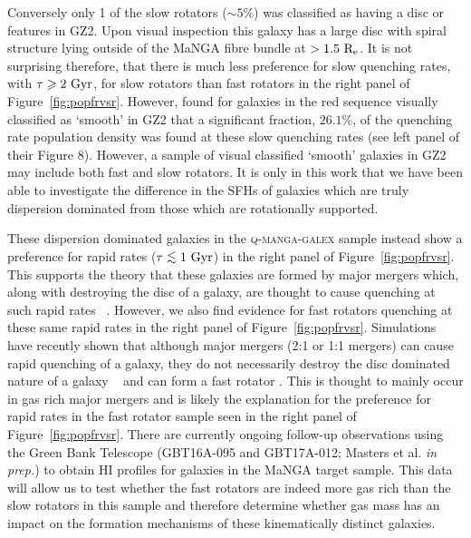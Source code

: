 \documentclass[useAMS,usenatbib]{mn2e}
\def\lesssim{\mathrel{\hbox{\rlap{\hbox{\lower3pt\hbox{$\sim$}}}\hbox{\raise2pt\hbox{$<$}}}}}
\begin{document}
Conversely only 1 of the slow rotators ($\sim5\%$) was classified as having a disc or features in GZ2. Upon visual inspection this galaxy has a large disc with spiral structure lying outside of the MaNGA fibre bundle at $>1.5~\rm{R_e}$. It is not surprising therefore, that there is much less preference for slow quenching rates, with $\tau \geq 2~\rm{Gyr}$, for slow rotators than fast rotators in the right panel of Figure~\ref{fig:popfrvsr}. However, \cite{smethurst15} found for galaxies in the red sequence visually classified as `smooth' in GZ2 that a significant fraction, $26.1\%$, of the quenching rate population density was found at these slow quenching rates (see left panel of their Figure 8). However, a sample of  visual classified `smooth' galaxies in GZ2 may include both fast and slow rotators. It is only in this work that we have been able to investigate the difference in the SFHs of galaxies which are truly dispersion dominated from those which are rotationally supported.

These dispersion dominated galaxies in the \textsc{q-manga-galex} sample instead show a preference for rapid rates ($\tau\lesssim1~\rm{Gyr}$) in the right panel of Figure~\ref{fig:popfrvsr}. This supports the theory that these galaxies are formed by major mergers which, along with destroying the disc of a galaxy, are thought to cause quenching at such rapid rates ~\citep{springel05b, bell06, lotz08b,lotz11,smethurst15}.   However, we also find evidence for fast rotators quenching at these same rapid rates in the right panel of Figure~\ref{fig:popfrvsr}. Simulations have recently shown that although major mergers (2:1 or 1:1 mergers) can cause rapid quenching of a galaxy, they do not necessarily destroy the disc dominated nature of a galaxy ~\citep{pontzen16, sparre16} and can form a fast rotator \citep{bois11}. This is thought to mainly occur in gas rich major mergers \citep{bois11} and is likely the explanation for the preference for rapid rates in the fast rotator sample seen in the right panel of Figure~\ref{fig:popfrvsr}. There are currently ongoing follow-up observations using the Green Bank Telescope (GBT16A-095 and GBT17A-012; Masters et al. \emph{in prep.}) to obtain HI profiles for galaxies in the MaNGA target sample. This data will allow us to test whether the fast rotators are indeed more gas rich than the slow rotators in this sample and therefore determine whether gas mass has an impact on the formation mechanisms of these kinematically distinct galaxies. 

\end{document}
